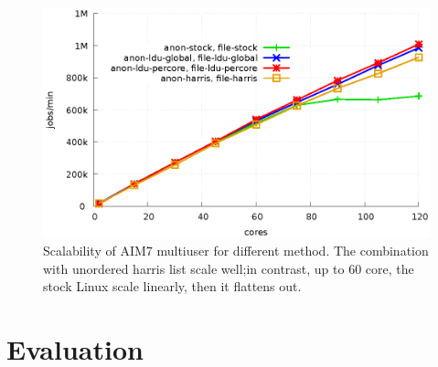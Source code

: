

\begin{figure}[tb]
  \begin{center}
    \includegraphics[scale=0.65]{graph/aim7.eps}
  \end{center}
  \caption{Scalability of AIM7 multiuser for different method.  The combination
   with unordered harris list scale well;in contrast, up to 60 core, the
  stock Linux scale linearly, then it  flattens out.}
  \label{fig:aim7}
\end{figure}

\section{Evaluation}



